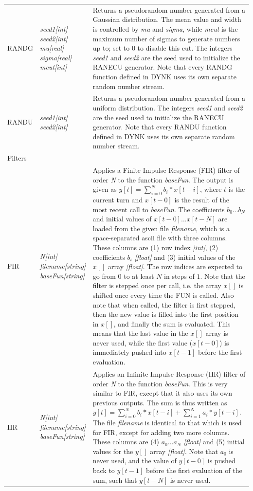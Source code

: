 \documentclass[a4paper,11pt]{report}
\begin{document}
\begin{center}
\begin{longtable}{|p{2.25cm} | p{4cm} p{9.5cm}|}
  RANDG      & \emph{seed1[int] seed2[int] mu[real] sigma[real] mcut[int]} &
  Returns a pseudorandom number generated from a Gaussian distribution.
  The mean value and width is controlled by \emph{mu} and \emph{sigma}, while \emph{mcut} is the maximum number of sigmas to generate numbers up to; set to 0 to disable this cut.
  The integers \emph{seed1} and \emph{seed2} are the seed used to initialize the RANECU generator.
  Note that every RANDG function defined in DYNK uses its own separate random number stream.\\

  RANDU      & \emph{seed1[int] seed2[int]} &
  Returns a pseudorandom number generated from a uniform distribution.
  The integers \emph{seed1} and \emph{seed2} are the seed used to initialize the RANECU generator.
  Note that every RANDU function defined in DYNK uses its own separate random number stream.\\
  
  \hline
  \rowcolor{blue!15}
  Filters & & \\*
  
  FIR        & \emph{N[int] filename[string] baseFun[string]} &
  Applies a Finite Impulse Response (FIR) filter of order \emph{N} to the function \emph{baseFun}.
  The output is given as $y[t] = \sum_{i=0}^N b_i*x[t-i]$, where $t$ is the current turn and $x[t-0]$ is the result of the most recent call to \emph{baseFun}.
  The coefficients $b_0 \ldots b_N$ and initial values of $x[t-0]\ldots x[t-N]$ are loaded from the given file \emph{filename}, which is a space-separated ascii file with three columns.
  These columns are (1) row index \emph{[int]}, (2) coefficients $b_i$ \emph{[float]} and (3) initial values of the $x[]$ array \emph{[float]}.
  The row indices are expected to go from $0$ to at least $N$ in steps of $1$.
  Note that the filter is stepped once per call, i.e. the array $x[]$ is shifted once every time the FUN is called.
  Also note that when called, the filter is first stepped, then the new value is filled into the first position in $x[]$, and finally the sum is evaluated.
  This means that the last value in the $x[]$ array is never used, while the first value ($x[t-0]$) is immediately pushed into $x[t-1]$ before the first evaluation.\\*
  
  IIR        & \emph{N[int] filename[string] baseFun[string]} &
  Applies an Infinite Impulse Response (IIR) filter of order \emph{N} to the function \emph{baseFun}.
  This is very similar to FIR, except that it also uses its own previous outputs.
  The sum is thus written as $y[t] = \sum_{i=0}^N b_i*x[t-i] + \sum_{i=1}^N a_i*y[t-i]$.
  The file \emph{filename} is identical to that which is used for FIR, except for adding two more columns.
  These columns are (4) $a_0\ldots a_N$ \emph{[float]} and (5) initial values for the $y[]$ array \emph{[float]}.
  Note that $a_0$ is never used, and the value of $y[t-0]$ is pushed back to $y[t-1]$ before the first evaluation of the sum, such that $y[t-N]$ is never used.\\


\end{longtable}
\end{center}
\end{document}
